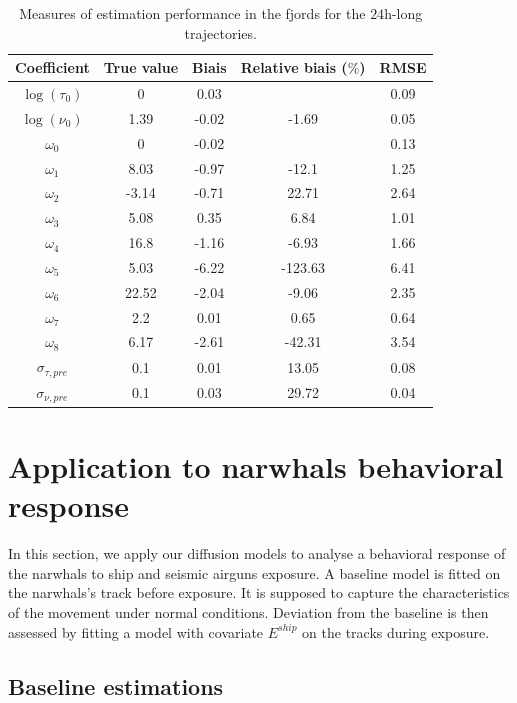 \documentclass[11pt]{article}
\newcommand {\1}{\mathbb{1}}
\theoremstyle{definition}
\theoremstyle{remark}
\theoremstyle{remark}
\begin{document}
\begin{table}[H]
	\centering
	\begin{tabular}{|c|c|c|c|c|}
		\hline
		Coefficient   & True value  & Biais & Relative biais ($\%$) & RMSE \\
		\hline
		$\log(\tau_0)$   & 0     & 0.03  &         & 0.09 \\
		$\log(\nu_0)$  & 1.39  & -0.02 & -1.69     & 0.05 \\
		$\omega_0$     & 0     & -0.02 &   & 0.13 \\
		$\omega_1$ & 8.03  & -0.97 & -12.1     & 1.25 \\
		$\omega_2$ & -3.14 & -0.71 & 22.71     & 2.64 \\
		$\omega_3$ & 5.08  & 0.35  & 6.84      & 1.01 \\
		$\omega_4$ & 16.8  & -1.16 & -6.93     & 1.66 \\
		$\omega_5$ & 5.03  & -6.22 & -123.63   & 6.41 \\
		$\omega_6$ & 22.52 & -2.04 & -9.06     & 2.35 \\
		$\omega_7$ & 2.2   & 0.01  & 0.65      & 0.64 \\
		$\omega_8$ & 6.17  & -2.61 & -42.31    & 3.54 \\
		$\sigma_{\tau,pre}$   & 0.1   & 0.01  & 13.05     & 0.08 \\
		$\sigma_{\nu,pre}$    & 0.1   & 0.03  & 29.72     & 0.04 \\
		\hline
	\end{tabular}
	\caption{Measures of estimation performance in the fjords for the $24$h-long trajectories.}
\label{table: estimation performance fjords 24h}
\end{table}


\section{Application to narwhals behavioral response}


In this section, we apply our diffusion models to analyse a behavioral response of the narwhals to ship and seismic airguns exposure.
A baseline model is fitted on the narwhals's track before exposure. It is supposed to capture the characteristics of the movement under normal conditions. Deviation from the baseline is then assessed by fitting a model with covariate $E^{ship}$ on the tracks during exposure.


\subsection{Baseline estimations}
\end{document}
